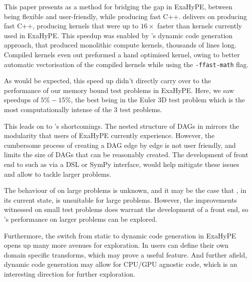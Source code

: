 This paper presents \phlat as a method for bridging the gap in ExaHyPE, between being flexible and user-friendly, while producing fast C++.
\phlat delivers on producing fast C++, producing kernels that were up to $16\times$ faster than kernels currently used in ExaHyPE.
This speedup was enabled by \phlat{}'s dynamic code generation approach, that produced monolithic compute kernels, thousands of lines long.
Compiled kernels even out preformed a hand optimised kernel, owing to better automatic vectorisation of the compiled kernels while using the \texttt{-ffast-math} flag.

As would be expected, this speed up didn't directly carry over to the performance of our memory bound test problems in ExaHyPE.
Here, we saw speedups of $5\% - 15\%$, the best being in the Euler 3D test problem which is the most computationally intense of the 3 test problems.

This leads on to \phlat{}'s shortcomings.
The nested structure of DAGs in \phlat mirrors the modularity that users of ExaHyPE currently experience.
However, the cumbersome process of creating a DAG edge by edge is not user friendly, and limits the size of DAGs that can be reasonably created.
The development of front end to \phlat such as via a DSL or SymPy interface, would help mitigate these issues and allow \phlat to tackle larger problems.

The behaviour of \phlat on large problems is unknown, and it may be the case that \phlat, in its current state, is unsuitable for large problems.
However, the improvements witnessed on small test problems does warrant the development of a front end, so \phlat{}'s performance on larger problems can be explored.

Furthermore, the switch from static to dynamic code generation in ExaHyPE opens up many more avenues for exploration.
In \phlat users can define their own domain specific transforms, which may prove a useful feature.
And further afield, dynamic code generation may allow for CPU/GPU agnostic code, which is an interesting direction for further exploration.

